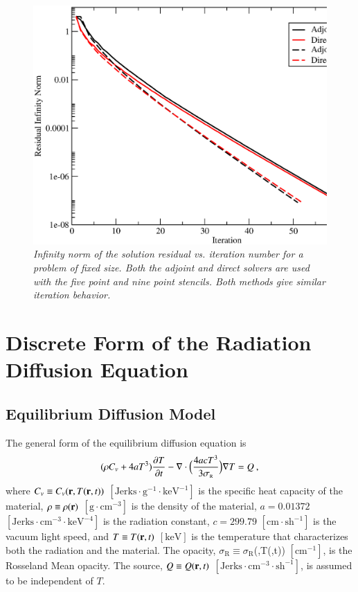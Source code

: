 \documentclass[preprint,12pt]{elsarticle}
\newcommand{\Cv}{\ensuremath{C_{v}}}
\newcommand{\ros}{\ensuremath{\sigma_{\scriptscriptstyle\mathrm{R}}}}
\begin{document}
\begin{figure}[htpb!]
  \centering
  \includegraphics[width=5in,clip]{Adjoint_Direct_Convergence.eps}
  \caption{\sl Infinity norm of the solution residual vs. iteration
    number for a problem of fixed size. Both the adjoint and direct
    solvers are used with the five point and nine point stencils. Both
    methods give similar iteration behavior.}
  \label{fig:poisson_convergence}
\end{figure}

\section{Discrete Form of the Radiation Diffusion Equation}
\label{sec:discr-form-radi}

\subsection{Equilibrium Diffusion Model}

The general form of the equilibrium diffusion equation is
\cite{morel_1996}
\begin{equation} 
  (\rho\Cv + 4aT^{3})\pder{T}{t} -
  \nabla\cdot{\Bigl(\frac{4acT^{3}}{3\ros}\Bigr)\grad{T}} = Q\:,
  \label{eq:eq-diff-T}
\end{equation}
where $\Cv\equiv\Cv(\ve{r},T(\ve{r},t))$
$[\text{Jerks}\cdot\text{g}^{-1}\cdot\text{keV}^{-1}]$ is the specific
heat capacity of the material, $\rho\equiv\rho(\mathbf{r})$
$[\text{g}\cdot\text{cm}^{-3}]$ is the density of the material,
$a=0.01372$ $[\text{Jerks}\cdot\text{cm}^{-3}\cdot\text{keV}^{-4}]$ is
the radiation constant, $c=299.79$ $[\text{cm}\cdot\text{sh}^{-1}]$ is
the vacuum light speed, and $T\equiv T(\mathbf{r},t)$ $[\text{keV}]$ is
the temperature that characterizes both the radiation and the
material.  The opacity, $\ros\equiv\ros$(,T(,t))
$[\text{cm}^{-1}]$, is the Rosseland Mean opacity.  The source,
$Q\equiv Q(\mathbf{r},t)$
$[\text{Jerks}\cdot\text{cm}^{-3}\cdot\text{sh}^{-1}]$, is assumed to
be independent of $T$.
\end{document}
